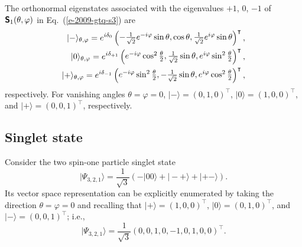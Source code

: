 The orthonormal eigenstates associated with the eigenvalues $+1$, $0$, $-1$ of
$\textsf{\textbf{S}}_1(\theta , \varphi )$ in Eq.~(\ref{e-2009-gtq-s3})
are
\begin{equation}
\label{l-soksp-ev}
\begin{split}
\vert -\rangle_{\theta ,\varphi} =e^{i\delta_0}\begin{pmatrix}
-{1\over \sqrt{2}} e^{-i\varphi} \sin \theta , \cos \theta , {1\over \sqrt{2}} e^{i\varphi}\sin \theta
\end{pmatrix}^\intercal ,\\
\vert 0\rangle_{\theta ,\varphi} =e^{i\delta_{+1}}\begin{pmatrix}
e^{-i\varphi} \cos^2{\theta \over 2}, {1\over \sqrt{2}}   \sin \theta ,e^{i\varphi}  \sin^2{\theta \over 2}
\end{pmatrix}^\intercal ,\\
\vert +\rangle_{\theta ,\varphi} =e^{i\delta_{-1}}\begin{pmatrix}
e^{-i\varphi} \sin^2{\theta \over 2}, - {1\over \sqrt{2}}     \sin \theta , e^{i\varphi}\cos^2{\theta \over 2}
\end{pmatrix}^\intercal ,
\end{split}
\end{equation}
respectively.
For vanishing angles $\theta =\varphi =0$,
$\vert -\rangle = \left( 0,1,0\right)^\intercal$,
$\vert 0\rangle = \left( 1,0,0\right)^\intercal$,  and
$\vert +\rangle = \left( 0,0,1\right)^\intercal$, respectively.



\subsection{Singlet state}

Consider the two spin-one particle singlet state
\begin{equation}
\label{2009-gtq-s1}
\vert \Psi_{3,2,1} \rangle  =  \frac{1}{\sqrt{3}}\left(-|00\rangle + |-+\rangle + |+-\rangle \right)
.
\end{equation}
Its vector space representation can be explicitly enumerated by taking the direction $\theta =\varphi =0$ and recalling that
$\vert +\rangle = \left(1,0,0\right)^\intercal$,
$\vert 0\rangle = \left(0,1,0\right)^\intercal$, and
$\vert -\rangle = \left(0,0,1\right)^\intercal$; i.e.,
\begin{equation}
\label{2009-gtq-s1ef}
\vert \Psi_{3,2,1} \rangle  =  \frac{1}{\sqrt{3}}  \left(0,0,1,0,-1,0,1,0,0 \right)^\intercal
.
\end{equation}




